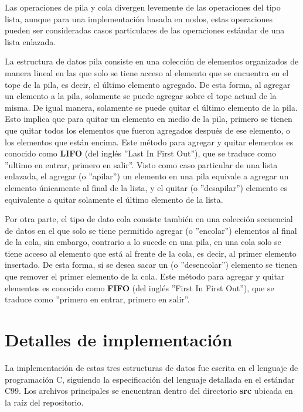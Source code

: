 \documentclass[titlepage,a4paper]{article}
\begin{document}
Las operaciones de pila y cola divergen levemente de las operaciones del tipo lista, aunque para una implementación basada en nodos, estas operaciones pueden ser consideradas casos particulares de las operaciones estándar de una lista enlazada.

La estructura de datos pila consiste en una colección de elementos organizados de manera lineal en las que solo se tiene acceso al elemento que se encuentra en el tope de la pila, es decir, el último elemento agregado. De esta forma, al agregar un elemento a la pila, solamente se puede agregar sobre el tope actual de la misma. De igual manera, solamente se puede quitar el último elemento de la pila. Esto implica que para quitar un elemento en medio de la pila, primero se tienen que quitar todos los elementos que fueron agregados después de ese elemento, o los elementos que están encima. Este método para agregar y quitar elementos es conocido como \textbf{LIFO} (del inglés ''Last In First Out''), que se traduce como ''ultimo en entrar, primero en salir''. Visto como caso particular de una lista enlazada, el agregar (o ''apilar'') un elemento en una pila equivale a agregar un elemento únicamente al final de la lista, y el quitar (o ''desapilar'') elemento es equivalente a quitar solamente el último elemento de la lista.

Por otra parte, el tipo de dato cola consiste también en una colección secuencial de datos en el que solo se tiene permitido agregar (o ''encolar'') elementos al final de la cola, sin embargo, contrario a lo sucede en una pila, en una cola solo se tiene acceso al elemento que está al frente de la cola, es decir, al primer elemento insertado. De esta forma, si se desea sacar un (o ''desencolar'') elemento se tienen que remover el primer elemento de la cola. Este método para agregar y quitar elementos es conocido como \textbf{FIFO} (del inglés ''First In First Out''), que se traduce como ''primero en entrar, primero en salir''.


\section{Detalles de implementación}\label{sec:implementacion}

La implementación de estas tres estructuras de datos fue escrita en el lenguaje de programación C, siguiendo la especificación del lenguaje detallada en el estándar C99. Los archivos principales se encuentran dentro del directorio \textbf{src} ubicada en la raíz del repositorio. 
\end{document}
